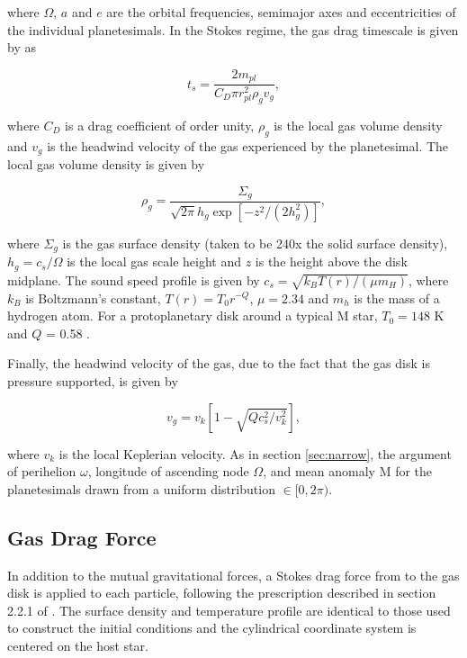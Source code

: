 \documentclass[twocolumn]{aastex63}
\begin{document}
\noindent where $\Omega$, $a$ and $e$ are the orbital frequencies, semimajor axes and eccentricities of the individual planetesimals. In the Stokes regime, the gas drag timescale is given by \citet{adachi76} as

\begin{equation}\label{eq:ts_stokes}
    t_{s} = \frac{2 m_{pl}}{C_{D} \pi r_{pl}^{2} \rho_{g} v_{g}},
\end{equation}

\noindent where $C_{D}$ is a drag coefficient of order unity, $\rho_{g}$ is the local gas volume density and $v_{g}$ is the headwind velocity of the gas experienced by the planetesimal. The local gas volume density is given by

\begin{equation}\label{eq:rho_gas}
	\rho_{g} = \frac{\Sigma_{g}}{\sqrt{2 \pi} h_{g} \exp\left[ -z^{2} / \left( 2 h_{g}^{2} \right) \right]},
\end{equation}

\noindent where $\Sigma_{g}$ is the gas surface density (taken to be 240x the solid surface density), $h_{g} = c_{s} / \Omega$ is the local gas scale height and $z$ is the height above the disk midplane. The sound speed profile is given by $c_{s} = \sqrt{k_{B} T(r) / \left( \mu m_{H} \right)}$, where $k_{B}$ is Boltzmann's constant, $T(r) = T_{0} r^{-Q}$, $\mu = 2.34$ and $m_{h}$ is the mass of a hydrogen atom. For a protoplanetary disk around a typical M star, $T_{0} = 148$ K and $Q$ = 0.58 \citep{andrews05}.

Finally, the headwind velocity of the gas, due to the fact that the gas disk is pressure supported, is given by

\begin{equation}\label{eq:v_gas}
	v_{g} = v_{k} \left[ 1 - \sqrt{ Q c_{s}^2 / v_{k}^2} \right],
\end{equation}

\noindent where $v_{k}$ is the local Keplerian velocity. As in section \ref{sec:narrow}, the argument of perihelion $\omega$, longitude of ascending node $\Omega$, and mean anomaly M for the planetesimals drawn from a uniform distribution $\in [0, 2 \pi)$.

\subsection{Gas Drag Force}

In addition to the mutual gravitational forces, a Stokes drag force from to the gas disk is applied to each particle, following the prescription described in section 2.2.1 of \citet{morishima10}. The surface density and temperature profile are identical to those used to construct the initial conditions and the cylindrical coordinate system is centered on the host star.
\end{document}
